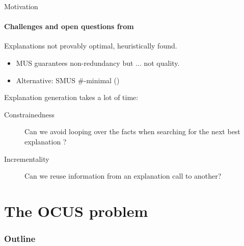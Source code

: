 \documentclass{beamer}
\theoremstyle{problemspec}
\renewcommand\emph[1]{{\color{vuborange}#1}}
\begin{document}
	
	\begin{frame}{Motivation}
		\framesubtitle{Challenges and open questions from \cite{bogaerts2020step}}
		
		\begin{description}[font=\color{vuborange}\itshape]
			\item[Optimality] Explanations not provably optimal, \emph{heuristically} found.
			\begin{itemize}
				\item[$\triangleright$] MUS guarantees non-redundancy but ... not quality.
				\item[$\triangleright$] Alternative: SMUS $\#$-minimal (\cite{ignatiev2015smallest})
			\end{itemize} \pause		
			\item[Efficiency] Explanation generation takes a lot of time: \pause
			\begin{description}
				\item[Constrainedness] Can we avoid looping over the facts when searching for the next best explanation ?\pause
				\item[Incrementality] Can we reuse information from an explanation call to another?
			\end{description}
		\end{description}
		
	\end{frame}
	
		\section{The OCUS problem}
		
					\begin{frame}
			\frametitle{Outline}
			\tableofcontents[currentsection]
		\end{frame}
		
\end{document}
